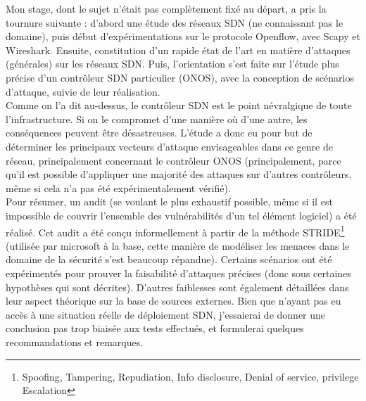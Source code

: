 Mon stage, dont le sujet n'était pas complètement fixé au départ, a pris la tournure suivante : d'abord une étude des réseaux SDN (ne connaissant pas le domaine), puis début d'expérimentations sur le protocole Openflow, avec Scapy et Wireshark. Ensuite, constitution d'un rapide état de l'art en matière d'attaques (générales) sur les réseaux SDN. Puis, l'orientation s'est faite sur l'étude plus précise d'un contrôleur SDN particulier (ONOS), avec la conception de scénarios d'attaque, suivie de leur réalisation.\\
Comme on l'a dit au-dessus, le contrôleur SDN est le point névralgique de toute l'infrastructure. Si on le compromet d'une manière où d'une autre, les conséquences peuvent être désastreuses. L'étude a donc eu pour but de déterminer les principaux vecteurs d'attaque envisageables dans ce genre de réseau, principalement concernant le contrôleur ONOS (principalement, parce qu'il  est possible d'appliquer une majorité des attaques sur d'autres contrôleurs, même si cela n'a pas été expérimentalement vérifié).\\
Pour résumer, un audit (se voulant le plus exhaustif possible, même si il est impossible de couvrir l'ensemble des vulnérabilités d'un tel élément logiciel) a été réalisé. Cet audit a été conçu informellement à partir de la méthode STRIDE\footnote{Spoofing, Tampering, Repudiation, Info disclosure, Denial of service, privilege Escalation} (utilisée par microsoft à la base, cette manière de modéliser les menaces dans le domaine de la sécurité s’est beaucoup répandue). Certains scénarios ont été expérimentés pour prouver la faisabilité d'attaques précises (donc sous certaines hypothèses qui sont décrites). D'autres faiblesses sont également détaillées dans leur aspect théorique sur la base de sources externes. Bien que n'ayant pas eu accès à une situation réelle de déploiement SDN, j'essaierai de donner une conclusion pas trop biaisée aux tests effectués, et formulerai quelques recommandations et remarques.